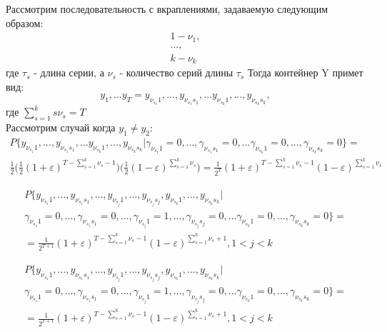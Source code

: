 \documentclass[a4paper,12pt]{article}
\theoremstyle{plain}
\begin{document}
	Рассмотрим последовательность с вкраплениями, задаваемую следующим образом:
	\begin{gather*}
	1 - \nu_1,\\
	...,\\
	k - \nu_k 
	\end{gather*}
где $\tau_s$ - длина серии, а $\nu_s$ - количество серий длины $\tau_s$
Тогда контейнер Y примет вид:
\begin{equation}y_1,... y_T = y_{\nu_{s_1}1},..., y_{\nu_{s_1}s_1}, ...y_{\nu_{s_k}1},...,y_{\nu_{s_k}s_k},
\end{equation}
 где $\sum\limits_{s=1}^{k}s\nu_s=T$\\
 Рассмотрим случай когда $y_1\neq y_2$:
 \begin{gather*}
 P\{y_{\nu_{s_1}1},..., y_{\nu_{s_1}s_1}, ...y_{\nu_{s_k}1},...,y_{\nu_{s_k}s_k}|\gamma_{\nu_{s_1}1}=0,..., \gamma_{\nu_{s_1}s_1}=0, ...\gamma_{\nu_{s_k}1}=0,...,\gamma_{\nu_{s_k}s_k}=0\} =\\ \frac{1}{2}\biggl(\frac{1}{2}(1+\varepsilon)^{T-\sum\limits_{s=1}^{k}\nu_s-1}\biggl)\biggl(\frac{1}{2}(1-\varepsilon)^{\sum\limits_{s=1}^{k}\nu_s}\biggl) =\frac{1}{2^T}(1+\varepsilon)^{T-\sum\limits_{s=1}^{k}\nu_s-1} (1-\varepsilon)^{\sum\limits_{s=1}^{k}\nu_s}
\end{gather*} 


 \begin{gather*}
 P\{y_{\nu_{s_1}1},..., y_{\nu_{s_1}s_1}, ...,y_{\nu_{s_j}1},...,y_{\nu_{s_j}s_j}, y_{\nu_{s_k}1},...,y_{\nu_{s_k}s_k}|\\ \gamma_{\nu_{s_1}1}=0, ..., \gamma_{\nu_{s_1}s_1}=0,...,\gamma_{\nu_{s_j}1}=1,...,\gamma_{\nu_{s_j}s_j}=0,  ...\gamma_{\nu_{s_k}1}=0,...,\gamma_{\nu_{s_k}s_k}=0\} =\\  =\frac{1}{2^{T+1}}(1+\varepsilon)^{T-\sum\limits_{s=1}^{k}\nu_s-1} (1-\varepsilon)^{\sum\limits_{s=1}^{k}\nu_s+1}, 1<j<k
 \end{gather*} 
 
 \begin{gather*}
 P\{y_{\nu_{s_1}1},..., y_{\nu_{s_1}s_1}, ...,y_{\nu_{s_j}1},...,y_{\nu_{s_j}s_j}, y_{\nu_{s_k}1},...,y_{\nu_{s_k}s_k}|\\ \gamma_{\nu_{s_1}1}=0, ..., \gamma_{\nu_{s_1}s_1}=0,...,\gamma_{\nu_{s_j}1}=1,...,\gamma_{\nu_{s_j}s_j}=0,  ...\gamma_{\nu_{s_k}1}=0,...,\gamma_{\nu_{s_k}s_k}=0\} =\\  =\frac{1}{2^{T+1}}(1+\varepsilon)^{T-\sum\limits_{s=1}^{k}\nu_s-1} (1-\varepsilon)^{\sum\limits_{s=1}^{k}\nu_s+1}, 1<j<k
 \end{gather*} 
 
\end{document}
